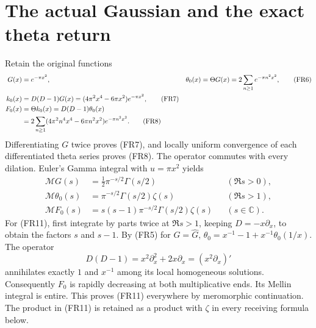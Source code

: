 \documentclass[11pt]{article}
\newcommand{\C}{\mathbb C}\newcommand{\R}{\mathbb R}
\newcommand{\M}{\mathcal M}\newcommand{\Sch}{\mathcal S}
\begin{document}
\section{The actual Gaussian and the exact theta return}
Retain the original functions
\begin{align}
 G(x)&=e^{-\pi x^2},& \theta_0(x)&=\Theta G(x)=2\sum_{n\geq1}e^{-\pi n^2x^2},\tag{FR6}\\
 k_0(x)&=D(D-1)G(x)=(4\pi^2x^4-6\pi x^2)e^{-\pi x^2},\tag{FR7}\\
 F_0(x)&=\Theta k_0(x)=D(D-1)\theta_0(x)\notag\\
 &=2\sum_{n\geq1}(4\pi^2n^4x^4-6\pi n^2x^2)e^{-\pi n^2x^2}.\tag{FR8}
\end{align}
Differentiating $G$ twice proves (FR7), and locally uniform convergence of each differentiated theta series proves (FR8). The operator commutes with every dilation. Euler's Gamma integral with $u=\pi x^2$ yields
\begin{align}
 \M G(s)&=\tfrac12\pi^{-s/2}\Gamma(s/2)&& (\Re s>0),\tag{FR9}\\
 \M\theta_0(s)&=\pi^{-s/2}\Gamma(s/2)\zeta(s)&& (\Re s>1),\tag{FR10}\\
 \M F_0(s)&=s(s-1)\pi^{-s/2}\Gamma(s/2)\zeta(s)&& (s\in\C).
 \tag{FR11}
\end{align}
For (FR11), first integrate by parts twice at $\Re s>1$, keeping $D=-x\partial_x$, to obtain the factors $s$ and $s-1$. By (FR5) for $G=\widehat G$,
$\theta_0=x^{-1}-1+x^{-1}\theta_0(1/x)$. The operator
\begin{equation}
 D(D-1)=x^2\partial_x^2+2x\partial_x=(x^2\partial_x)'
 \tag{FR12}
\end{equation}
annihilates exactly $1$ and $x^{-1}$ among its local homogeneous solutions. Consequently $F_0$ is rapidly decreasing at both multiplicative ends. Its Mellin integral is entire. This proves (FR11) everywhere by meromorphic continuation. The product in (FR11) is retained as a product with $\zeta$ in every receiving formula below.
\end{document}

